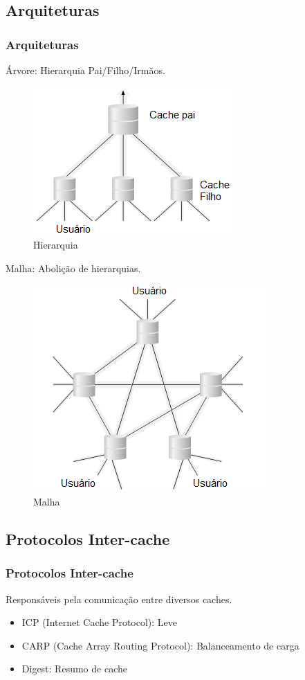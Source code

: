 \documentclass{beamer}
\begin{document}
   \subsection{Arquiteturas}
    \begin{frame}
      \frametitle{Arquiteturas}
      Árvore: Hierarquia Pai/Filho/Irmãos.\\
      \begin{figure}
       \centering
       \includegraphics[scale=0.3]{imagens/hierarquia.png}
       \caption{Hierarquia}
      \end{figure}

      Malha: Abolição de hierarquias.

      \begin{figure}
       \centering
       \includegraphics[scale=0.3]{imagens/mesh.png}
       \caption{Malha}
      \end{figure}
  
    \end{frame}

    \subsection{Protocolos Inter-cache}
    \begin{frame}
      \frametitle{Protocolos Inter-cache}
      Responsáveis pela comunicação entre diversos caches.
      \begin{itemize}
       \item ICP (Internet Cache Protocol): Leve
       \item CARP (Cache Array Routing Protocol): Balanceamento de carga       
       \item Digest: Resumo de cache
      \end{itemize} 
    \end{frame} 
\end{document}
